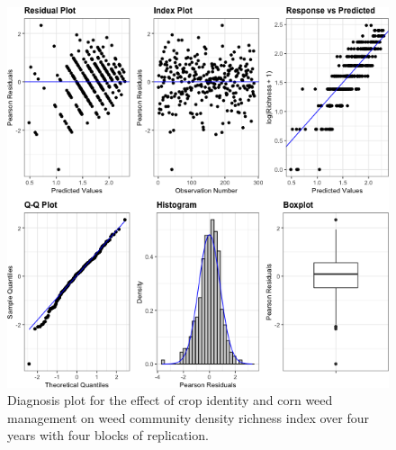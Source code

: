 \documentclass[
]{article}
\begin{document}
\begin{figure}
\centering
\includegraphics{AppendixA-model-diagnosis_files/figure-latex/dens-rich-mod-1.png}
\caption{\label{fig:dens-rich-mod}Diagnosis plot for the effect of crop identity and corn weed management on weed community density richness index over four years with four blocks of replication.}
\end{figure}
\end{document}
